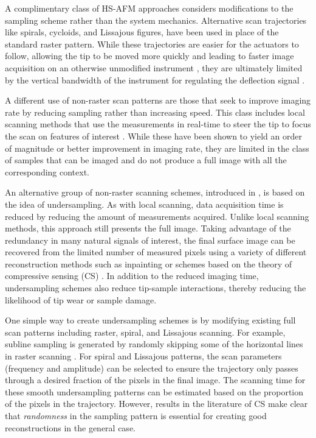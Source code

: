\documentclass[journal]{IEEEtran}
\begin{document}
A complimentary class of HS-AFM approaches considers modifications to
the sampling scheme rather than the system mechanics. Alternative scan
trajectories like spirals, cycloids, and Lissajous figures, have been
used in place of the standard raster pattern. While these trajectories are
easier for the actuators to follow, allowing the tip to be moved more
quickly and leading to faster image acquisition on an otherwise
unmodified instrument
\cite{Bazaei:2017dm,Wu:2015dt,Rana:2014bj,Tuma:2012hv,Yong:2010gm}, they are ultimately limited by the vertical bandwidth of
the instrument for regulating the deflection signal \cite{Teo:2016ev}.

A different use of non-raster scan patterns are those that seek to improve imaging rate by reducing sampling rather than increasing speed. This class includes local scanning methods that use the measurements in real-time to steer the tip to focus the scan on features of
interest \cite{Hartman:2018ja,Wen:2018fl,Zhang:2015cf,Huang:2014dw}.
While these have been shown to yield an order of magnitude or better
improvement in imaging rate, they are limited in the class of samples
that can be imaged and do not produce a full image with all the corresponding context.
	
An alternative group of non-raster scanning schemes, introduced in
\cite{song2011video,andersson2012non}, is based on the idea of
undersampling. As with local scanning, data acquisition time is
reduced by reducing the amount of measurements acquired. Unlike local
scanning methods, this approach still presents the full image. Taking
advantage of the redundancy in many natural signals of interest, the
final surface image can be recovered from the limited number of
measured pixels using a variety of different reconstruction methods
such as inpainting or schemes based on the theory of compressive
sensing (CS) \cite{chen2013enhancement,luo2015comparison}. In addition
to the reduced imaging time, undersampling schemes also reduce
tip-sample interactions, thereby reducing the likelihood of tip wear
or sample damage.
	
One simple way to create undersampling schemes is by modifying
existing full scan patterns including raster, spiral, and Lissajous
scanning. For example, subline sampling is generated by randomly
skipping some of the horizontal lines in raster scanning
\cite{han2018reconstruction,chen2013enhancement}. For spiral and
Lissajous patterns, the scan parameters (frequency and amplitude) can
be selected to ensure the trajectory only passes through a desired
fraction of the pixels in the final image. The scanning time for these
smooth undersampling patterns can be estimated based on the proportion
of the pixels in the trajectory. However, results in the literature of
CS make clear that \textit{randomness} in the sampling pattern is
essential for creating good reconstructions in the general case. %
	
\end{document}
